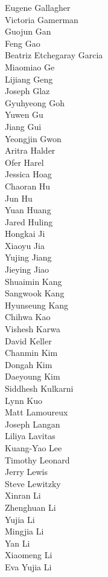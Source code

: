 Eugene Gallagher\\
Victoria Gamerman\\
Guojun  Gan\\
Feng Gao\\
Beatriz Etchegaray Garcia\\
Miaomiao Ge\\
Lijiang Geng\\
Joseph Glaz\\
Gyuhyeong Goh\\
Yuwen Gu\\
Jiang Gui\\
Yeongjin Gwon\\
Aritra Halder\\
Ofer Harel\\
Jessica Hoag\\
Chaoran Hu\\
Jun Hu\\
Yuan Huang\\
Jared Huling\\
Hongkai Ji\\
Xiaoyu Jia\\
Yujing Jiang\\
Jieying Jiao\\
Shuaimin Kang\\
Sangwook Kang\\
Hyunseung Kang\\
Chihwa Kao\\
Vishesh Karwa\\
David Keller\\
Chanmin Kim\\
Dongah Kim\\
Daeyoung Kim\\
Siddhesh Kulkarni\\
Lynn Kuo\\
Matt Lamoureux\\
Joseph Langan\\
Liliya Lavitas\\
Kuang-Yao Lee\\
Timothy Leonard\\
Jerry Lewis\\
Steve Lewitzky\\
Xinran Li\\
Zhenghuan Li\\
Yujia Li\\
Mingjia Li\\
Yan Li\\
Xiaomeng Li\\
Eva Yujia Li\\
